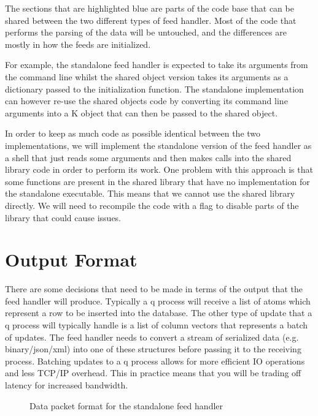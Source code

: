 The sections that are highlighted blue are parts of the code base that can be
shared between the two different types of feed handler. Most of the code that
performs the parsing of the data will be untouched, and the differences are
mostly in how the feeds are initialized.

For example, the standalone feed handler is expected to take its arguments
from the command line whilst the shared object version takes its arguments
as a dictionary passed to the initialization function. The standalone 
implementation can however re-use the shared objects code by converting its
command line arguments into a K object that can then be passed to the 
shared object.

In order to keep as much code as possible identical between the two 
implementations, we will implement the standalone version of the feed handler
as a shell that just reads some arguments and then makes calls into the shared
library code in order to perform its work. One problem with this approach is that
some functions are present in the shared library that have no implementation for
the standalone executable. This means that we cannot use the shared library directly.
We will need to recompile the code with a flag to disable parts of the library that
could cause issues.

\section{Output Format}

There are some decisions that need to be made in terms of the output that the
feed handler will produce. Typically a q process will receive a list of atoms
which represent a row to be inserted into the database. The other type of update
that a q process will typically handle is a list of column vectors that represents
a batch of updates. The feed handler needs to convert a stream of serialized data
(e.g. binary/json/xml) into one of these structures before passing it to the receiving
process. Batching updates to a q process allows for more efficient IO operations
and less TCP/IP overhead. This in practice means that you will be trading off latency
for increased bandwidth.

 \begin{figure}[H]
 	\centering
 	\caption{Data packet format for the standalone feed handler}
 	\label{datapacketformat}
 \end{figure}

